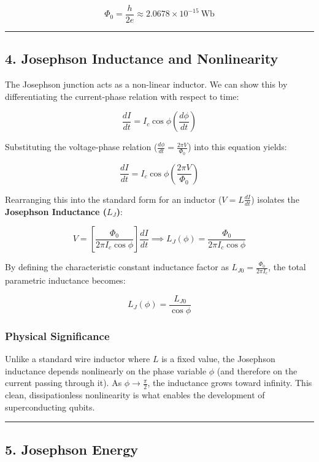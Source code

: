 \documentclass[
]{article}
\begin{document}
\[\Phi_0 = \frac{h}{2e} \approx 2.0678 \times 10^{-15}\ \text{Wb}\]

\begin{center}\rule{0.5\linewidth}{0.5pt}\end{center}

\subsection{4. Josephson Inductance and
Nonlinearity}\label{josephson-inductance-and-nonlinearity}

The Josephson junction acts as a non-linear inductor. We can show this
by differentiating the current-phase relation with respect to time:

\[\frac{dI}{dt} = I_c \cos \phi \left(\frac{d\phi}{dt}\right)\]

Substituting the voltage-phase relation
(\(\frac{d\phi}{dt} = \frac{2\pi V}{\Phi_0}\)) into this equation
yields:

\[\frac{dI}{dt} = I_c \cos \phi \left( \frac{2\pi V}{\Phi_0} \right)\]

Rearranging this into the standard form for an inductor
(\(V = L \frac{dI}{dt}\)) isolates the \textbf{Josephson Inductance
(\(L_J\))}:

\[V = \left[ \frac{\Phi_0}{2\pi I_c \cos \phi} \right] \frac{dI}{dt} \implies L_J(\phi) = \frac{\Phi_0}{2\pi I_c \cos \phi}\]

By defining the characteristic constant inductance factor as
\(L_{J0} = \frac{\Phi_0}{2\pi I_c}\), the total parametric inductance
becomes:

\[L_J(\phi) = \frac{L_{J0}}{\cos \phi}\]

\subsubsection{Physical Significance}\label{physical-significance}

Unlike a standard wire inductor where \(L\) is a fixed value, the
Josephson inductance depends nonlinearly on the phase variable \(\phi\)
(and therefore on the current passing through it). As
\(\phi \to \frac{\pi}{2}\), the inductance grows toward infinity. This
clean, dissipationless nonlinearity is what enables the development of
superconducting qubits.

\begin{center}\rule{0.5\linewidth}{0.5pt}\end{center}

\subsection{5. Josephson Energy}\label{josephson-energy}
\end{document}
